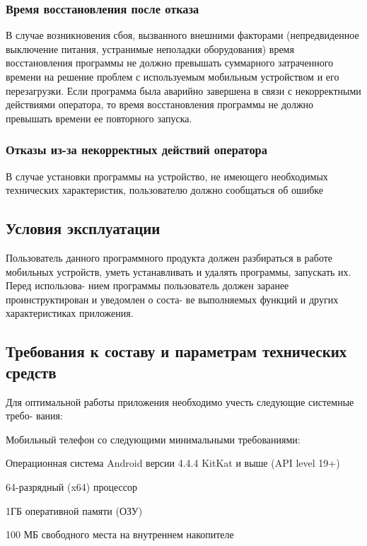 \subsubsection{Время восстановления после отказа} 
В случае возникновения сбоя, вызванного внешними факторами (непредвиденное
выключение питания, устранимые неполадки оборудования) время восстановления
программы не должно превышать суммарного затраченного времени на решение
проблем с используемым мобильным устройством и его перезагрузки. Если программа
была аварийно завершена в связи с некорректными действиями оператора, то время
восстановления программы не должно превышать времени ее повторного запуска.

\subsubsection{Отказы из-за некорректных действий оператора}
В случае установки программы на устройство, не имеющего необходимых технических
характеристик, пользователю должно сообщаться об ошибке


\subsection{Условия эксплуатации}
Пользователь данного программного продукта должен разбираться в работе мобильных
устройств, уметь устанавливать и удалять программы, запускать их. Перед использова-
нием программы пользователь должен заранее проинструктирован и уведомлен о соста-
ве выполняемых функций и других характеристиках приложения.

\subsection{Требования к составу и параметрам технических средств}
Для оптимальной работы приложения необходимо учесть следующие системные требо-
вания:
\begin{my_enumerate}
    \item Мобильный телефон со следующими минимальными требованиями:
        \begin{my_enumerate}
            \item Операционная система Android версии 4.4.4 KitKat и выше (API level 19+)
            \item 64-разрядный (x64) процессор
            \item 1ГБ оперативной памяти (ОЗУ)
            \item 100 МБ свободного места на внутреннем накопителе
        \end{my_enumerate}
\end{my_enumerate}


